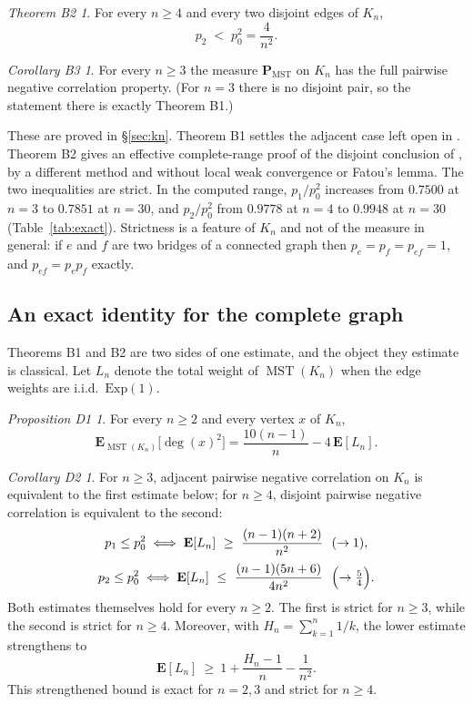 \documentclass[11pt,a4paper]{amsart}
\theoremstyle{plain}
\theoremstyle{definition}
\theoremstyle{remark}
\newtheorem*{theoremB2}{Theorem B2}
\newtheorem*{theoremB3}{Corollary B3}
\newtheorem*{theoremD1}{Proposition D1}
\newtheorem*{theoremD2}{Corollary D2}
\newcommand{\MST}{\operatorname{MST}}
\newcommand{\PMST}{\mathbf{P}_{\mathrm{MST}}}
\newcommand{\E}{\mathbf{E}}
\DeclareMathOperator{\dg}{deg}
\begin{document}
\begin{theoremB2}
For every $n\ge4$ and every two disjoint edges of $K_n$,
\[
p_2\;<\;p_0^2=\frac4{n^2}.
\]
\end{theoremB2}

\begin{theoremB3}
For every $n\ge3$ the measure $\PMST$ on $K_n$ has the full pairwise negative
correlation property. (For $n=3$ there is no disjoint pair, so the statement
there is exactly Theorem B1.)
\end{theoremB3}

These are proved in \S\ref{sec:kn}. Theorem B1 settles the adjacent case left
open in \cite[\S3.2.2]{TZ}. Theorem B2 gives an effective complete-range proof
of the disjoint conclusion of \cite[Theorem 1.1]{TZ}, by a different method and
without local weak convergence or Fatou's lemma. The two inequalities are
strict. In the computed range,
$p_1/p_0^2$ increases from $0.7500$ at $n=3$ to $0.7851$ at $n=30$, and
$p_2/p_0^2$ from $0.9778$ at $n=4$ to $0.9948$ at $n=30$
(Table~\ref{tab:exact}). Strictness is a feature of $K_n$ and not of the
measure in general: if $e$ and $f$ are two bridges of a connected graph then
$p_e=p_f=p_{ef}=1$, and $p_{ef}=p_ep_f$ exactly.

\subsection{An exact identity for the complete graph}
\label{ssec:introD}

Theorems B1 and B2 are two sides of one estimate, and the object they estimate
is classical. Let $L_n$ denote the total weight of $\MST(K_n)$ when the edge
weights are i.i.d.\ $\mathrm{Exp}(1)$.

\begin{theoremD1}
For every $n\ge2$ and every vertex $x$ of $K_n$,
\[
\E_{\MST(K_n)}\bigl[\dg(x)^2\bigr]=\frac{10(n-1)}{n}-4\,\E[L_n].
\]
\end{theoremD1}

\begin{theoremD2}
For $n\ge3$, adjacent pairwise negative correlation on $K_n$ is equivalent to
the first estimate below; for $n\ge4$, disjoint pairwise negative correlation is
equivalent to the second:
\begin{gather*}
p_1\le p_0^2\iff \E[L_n]\ \ge\ \frac{(n-1)(n+2)}{n^2}\ \ (\to1),\\[2pt]
p_2\le p_0^2\iff \E[L_n]\ \le\ \frac{(n-1)(5n+6)}{4n^2}\ \ \Bigl(\to\tfrac54\Bigr).
\end{gather*}
Both estimates themselves hold for every $n\ge2$. The first is strict for
$n\ge3$, while the second is strict for $n\ge4$.
Moreover, with $H_n=\sum_{k=1}^n1/k$, the lower estimate strengthens to
\[
\E[L_n]\ \ge\ 1+\frac{H_n-1}{n}-\frac1{n^2}.
\]
This strengthened bound is exact for $n=2,3$ and strict for $n\ge4$.
\end{theoremD2}
\end{document}

